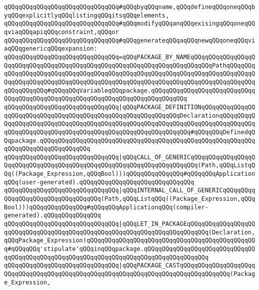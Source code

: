 \verb|qQQqqQQqqQQqqQQqqQQqqQQqqQQqqQQq#qQQqbyqQQqname,qQQqdefineqQQqoneqQQqbyqQQqexplicitlyqQQqlistingqQQqitsqQQqelements,|\newline
\verb|qQQqqQQqqQQqqQQqqQQqqQQqqQQqqQQq#qQQqmodifyqQQqanqQQqexisingqQQqoneqQQqviaqQQqapiqQQqconstraint,qQQqor|\newline
\verb|qQQqqQQqqQQqqQQqqQQqqQQqqQQqqQQq#qQQqgenerateqQQqaqQQqnewqQQqoneqQQqviaqQQqgenericqQQqexpansion:|\newline
\newline
\verb|qQQqqQQqqQQqqQQqqQQqqQQqqQQqqQQq=qQQqPACKAGE_BY_NAMEqQQqqQQqqQQqqQQqqQQqqQQqqQQqqQQqqQQqqQQqqQQqqQQqqQQqqQQqqQQqqQQqqQQqqQQqqQQqPathqQQqqQQqqQQqqQQqqQQqqQQqqQQqqQQqqQQqqQQqqQQqqQQqqQQqqQQqqQQqqQQqqQQqqQQqqQQqqQQqqQQqqQQqqQQqqQQqqQQqqQQqqQQqqQQqqQQqqQQqqQQqqQQqqQQqqQQqqQQqqQQqqQQqqQQqqQQqqQQq#qQQqqQQqVariableqQQqpackage.qQQqqQQqqQQqqQQqqQQqqQQqqQQqqQQqqQQqqQQqqQQqqQQqqQQqqQQqqQQqqQQqqQQqqQQqqQQqqQQq|\newline
\verb|qQQqqQQqqQQqqQQqqQQqqQQqqQQqqQQq|\verb#|qQQqPACKAGE_DEFINITIONqQQqqQQqqQQqqQQqqQQqqQQqqQQqqQQqqQQqqQQqqQQqqQQqqQQqqQQqqQQqqQQqDeclarationqQQqqQQqqQQqqQQqqQQqqQQqqQQqqQQqqQQqqQQqqQQqqQQqqQQqqQQqqQQqqQQqqQQqqQQqqQQqqQQqqQQqqQQqqQQqqQQqqQQqqQQqqQQqqQQqqQQqqQQqqQQqqQQqqQQq#\verb|#qQQqqQQqDefinedqQQqpackage.qQQqqQQqqQQqqQQqqQQqqQQqqQQqqQQqqQQqqQQqqQQqqQQqqQQqqQQqqQQqqQQqqQQqqQQqqQQqqQQqqQQq|\newline
\verb|qQQqqQQqqQQqqQQqqQQqqQQqqQQqqQQq|\verb#|qQQqCALL_OF_GENERICqQQqqQQqqQQqqQQqqQQqqQQqqQQqqQQqqQQqqQQqqQQqqQQqqQQqqQQqqQQqqQQqqQQqqQQq(Path,qQQqListqQQq((Package_Expression,qQQqBool)))qQQqqQQqqQQqqQQq#\verb|#qQQqqQQqApplicationqQQq(user-generated).qQQqqQQqqQQqqQQqqQQqqQQqqQQqqQQq|\newline
\verb|qQQqqQQqqQQqqQQqqQQqqQQqqQQqqQQq|\verb#|qQQqINTERNAL_CALL_OF_GENERICqQQqqQQqqQQqqQQqqQQqqQQqqQQqqQQqqQQq(Path,qQQqListqQQq((Package_Expression,qQQqBool)))qQQqqQQqqQQqqQQq#\verb|#qQQqqQQqApplicationqQQq(compiler-generated).qQQqqQQqqQQqqQQq|\newline
\verb|qQQqqQQqqQQqqQQqqQQqqQQqqQQqqQQq|\verb#|qQQqLET_IN_PACKAGEqQQqqQQqqQQqqQQqqQQqqQQqqQQqqQQqqQQqqQQqqQQqqQQqqQQqqQQqqQQqqQQqqQQqqQQqqQQq(Declaration,qQQqPackage_Expression)qQQqqQQqqQQqqQQqqQQqqQQqqQQqqQQqqQQqqQQqqQQqqQQq#\verb|#qQQqqQQq'stipulate'qQQqinqQQqpackage.qQQqqQQqqQQqqQQqqQQqqQQqqQQqqQQqqQQqqQQqqQQqqQQqqQQqqQQqqQQqqQQqqQQqqQQqqQQqqQQqqQQqqQQq|\newline
\verb|qQQqqQQqqQQqqQQqqQQqqQQqqQQqqQQq|\verb#|qQQqPACKAGE_CASTqQQqqQQqqQQqqQQqqQQqqQQqqQQqqQQqqQQqqQQqqQQqqQQqqQQqqQQqqQQqqQQqqQQqqQQqqQQqqQQqqQQq(Package_Expression,#\newline
